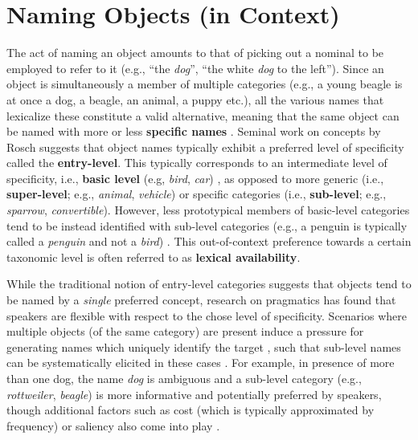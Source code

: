 \documentclass[runningheads]{llncs}
\begin{document}
\section{Naming Objects (in Context)}
\label{sec:object_naming}

The act of naming an object amounts to that of picking out a nominal to be employed to refer to it (e.g., ``the \textit{dog}'', ``the white \textit{dog} to the left'').
Since an object is simultaneously a member of multiple categories (e.g., a young beagle is at once a dog, a beagle, an animal, a puppy etc.), all the various names that lexicalize these constitute a valid alternative, meaning that the same object can be named with more or less \textbf{specific names} \cite{brown1958shall,murphy2004big}. 
Seminal work on concepts by Rosch suggests that object names typically exhibit a preferred level of specificity called the \textbf{entry-level}. This typically corresponds to an intermediate level of specificity, i.e., \textbf{basic level} (e.g, \textit{bird}, \textit{car}) \cite{rosch1976basic}, as opposed to more generic (i.e., \textbf{super-level}; e.g., \textit{animal}, \textit{vehicle}) or specific categories (i.e., \textbf{sub-level}; e.g., \textit{sparrow}, \textit{convertible}). However, less prototypical members of basic-level categories tend to be instead identified with sub-level categories (e.g., a penguin is typically called a \textit{penguin} and not a \textit{bird}) \cite{jolicoeur1984pictures}. This out-of-context preference towards a certain taxonomic level is often referred to as \textbf{lexical availability}. 

While the traditional notion of entry-level categories suggests that objects tend to be named by a \textit{single} preferred concept, research on pragmatics has found that speakers are flexible with respect to the chose level of specificity.
Scenarios where multiple objects (of the same category) are present induce a pressure for generating names which uniquely identify the target \cite{olson1970language}, such that sub-level names can be systematically elicited in these cases \cite{rohde2012communicating} \cite{graf2016animal}. For example, in presence of more than one dog, the name \textit{dog} is ambiguous and a sub-level category (e.g., \textit{rottweiler}, \textit{beagle}) is more informative and potentially preferred by speakers, though additional factors such as cost (which is typically approximated by frequency) or saliency also come into play \cite{graf2016animal}  \cite{clark1983common}.
\end{document}
